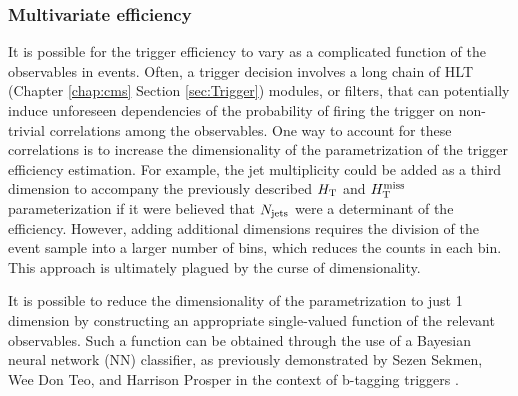 \subsubsection{Multivariate efficiency }
\label{sec:mvatrigger}
It is possible for the trigger efficiency to vary as a complicated function of the observables in events. Often, a trigger decision involves a long chain of HLT (Chapter \ref{chap:cms} Section \ref{sec:Trigger}) modules, or filters, that can potentially induce unforeseen dependencies of the probability of firing the trigger on non-trivial correlations among the observables. One way to account for these correlations is to increase the dimensionality of the parametrization of the trigger efficiency estimation. For example, the jet multiplicity could be added as a third dimension to accompany the previously described $H_{\rm T}$ and $H_{\text{T}}^{\rm miss}$ parameterization if it were believed that $N_{\rm jets}$ were a determinant of the efficiency. However, adding additional dimensions requires the division of the event sample into a larger number of bins, which reduces the counts in each bin. This approach is ultimately plagued by the curse of dimensionality.

It is possible to reduce the dimensionality of the parametrization to just 1 dimension by constructing an appropriate single-valued function of the relevant observables. Such a function can be obtained through the use of a Bayesian neural network (NN) classifier, as previously demonstrated by Sezen Sekmen, Wee Don Teo, and Harrison Prosper in the context of b-tagging triggers \cite{bib:SezenTrigger}. 

